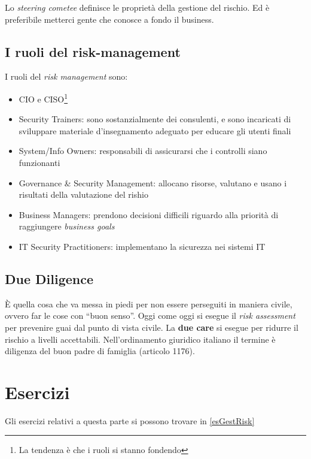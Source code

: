 Lo \textit{steering cometee} definisce le proprietà della gestione del rischio.
Ed è preferibile metterci gente che conosce a fondo il business.

\subsection{I ruoli del risk-management}

I ruoli del \textit{risk management} sono:
\begin{itemize}
\item CIO e CISO\footnote{La tendenza è che i ruoli si stanno fondendo}
\item Security Trainers: sono sostanzialmente dei consulenti, e sono incaricati
di sviluppare materiale d'insegnamento adeguato per educare gli utenti finali
\item System/Info Owners: responsabili di assicurarsi che i controlli siano
funzionanti
\item Governance \& Security Management: allocano risorse, valutano e usano i
risultati della valutazione del rishio
\item Business Managers: prendono decisioni difficili riguardo alla priorit\`a
di raggiungere \textit{business goals}
\item IT Security Practitioners: implementano la sicurezza nei sistemi IT
\end{itemize}

\subsection{Due Diligence}

È quella cosa che va messa in piedi per non essere perseguiti in maniera civile,
ovvero far le cose con ``buon senso''. Oggi come oggi si esegue il \textit{risk
assessment} per prevenire guai dal punto di vista civile. La \textbf{due care}
si esegue per ridurre il rischio a livelli accettabili. Nell'ordinamento
giuridico italiano il termine è diligenza del buon padre di famiglia (articolo
1176).


\section{Esercizi}

Gli esercizi relativi a questa parte si possono trovare in \ref{esGestRisk}
